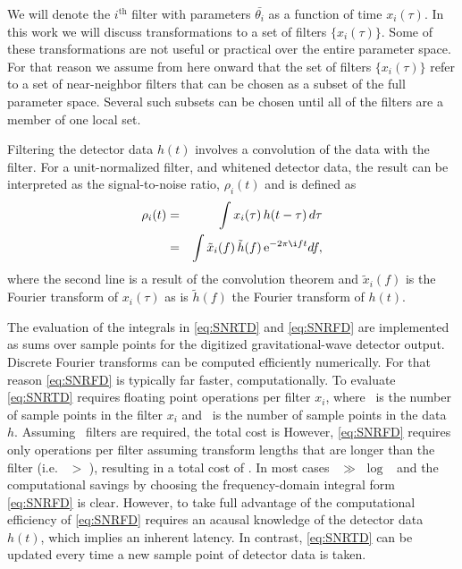 We will denote the $i^\mathrm{th}$ filter with parameters $\bar{\theta_i}$
as a function of time $x_i(\tau)$.
In this work we will discuss transformations to a set of filters
$\{x_i(\tau)\}$.  Some of these transformations are not useful or practical
over the entire parameter space.  For that reason we assume from here onward
that the set of filters $\{x_i(\tau)\}$ refer to a set of near-neighbor filters
that can be chosen as a subset of the full parameter space.  Several such
subsets can be chosen until all of the filters are a member of one local set.

Filtering the detector data $h(t)$ involves a convolution of the data with the
filter.  For a unit-normalized filter, and whitened detector data, the result
can be interpreted as the signal-to-noise ratio, $\rho_i(t)$ and is defined as
%
%
\begin{eqnarray}
\rho_i(t) &=& \int x_i(\tau) \, h(t-\tau) \, d \tau \label{eq:SNRTD} \\
          &=& \int \tilde{x}_i(f) \, \tilde{h}(f) \, \e^{-2\pi\i ft} \label{eq:SNRFD} df,
\end{eqnarray}
%
%
where the second line is a result of the convolution theorem and
$\tilde{x}_i(f)$ is the Fourier transform of $x_i(\tau)$ as is $\tilde{h}(f)$ the
Fourier transform of $h(t)$.

The evaluation of the integrals in \eqref{eq:SNRTD} and \eqref{eq:SNRFD} are
implemented as sums over sample points for the digitized gravitational-wave
detector output.  Discrete Fourier transforms can be computed efficiently
numerically.  For that reason \eqref{eq:SNRFD} is typically far faster,
computationally.  To evaluate \eqref{eq:SNRTD} requires \order{\tmpsamps
\hoftsamps} floating point operations per filter $x_i$, where \tmpsamps\ is the
number of sample points in the filter $x_i$ and \hoftsamps\ is the number of
sample points in the data $h$.  Assuming \numtmps\ filters are required, the
total cost is \order{\numtmps \tmpsamps \hoftsamps} However, \eqref{eq:SNRFD}
requires only \order{\hoftsamps \log \hoftsamps} operations per filter assuming
transform lengths that are longer than the filter (i.e. \hoftsamps\ $>$
\tmpsamps), resulting in a total cost of \order{\numtmps \hoftsamps \log
\hoftsamps}.  In most cases \tmpsamps\ $\gg$ $\log$ \hoftsamps\ and the
computational savings by choosing the frequency-domain integral form
\eqref{eq:SNRFD} is clear.  However, to take full advantage of the
computational efficiency of \eqref{eq:SNRFD} requires an acausal knowledge of
the detector data $h(t)$, which implies an inherent latency.  In contrast,
\eqref{eq:SNRTD} can be updated every time a new sample point of detector data
is taken.  

